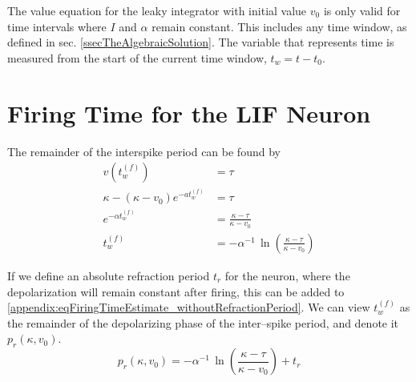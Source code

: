 	The value equation for the leaky integrator with initial value $v_0$ is only valid for time intervals where $I$ and $\alpha$ remain constant.
	This includes any time window, as defined in sec. \ref{ssecTheAlgebraicSolution}.
	The variable that represents time is measured from the start of the current time window, $t_w = t - t_0$.

\section{Firing Time for the LIF Neuron}
The remainder of the interspike period can be found by 
\label{appendixFiringTime}
		\begin{equation}
			\begin{split}
					v\left(t_w^{(f)}\right)			 							&= \tau \qquad 										\\	%
					\kappa - \left( \kappa - v_0 \right) e^{-at_w^{(f)}}  		&= \tau 											\\
					e^{-\alpha t_w^{(f)}} 			 						&= \frac{\kappa - \tau}{\kappa - v_0} 					\\
					t_w^{(f)}													&= -\alpha^{-1} \, \ln \left( \frac{\kappa - \tau}{\kappa - v_0} \right) 					
			\end{split}
			\label{appendix:eqFiringTimeEstimate_withoutRefractionPeriod}
		\end{equation}
		
		If we define an absolute refraction period $t_r$ for the neuron, where the depolarization will remain constant after firing, this can be added to \eqref{appendix:eqFiringTimeEstimate_withoutRefractionPeriod}.
		We can view $t_w^{(f)}$ as the remainder of the depolarizing phase of the inter--spike period, and denote it $p_r(\kappa, v_0)$.
		\begin{equation}
			p_r(\kappa, v_0)	 = -\alpha^{-1} \, \ln \left( \frac{\kappa - \tau}{\kappa - v_0} \right) + t_r
		\end{equation}



